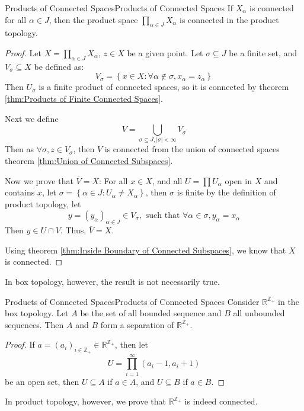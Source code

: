 \documentclass[../main.tex]{subfiles}
\begin{document}
\begin{theorem}{Products of Connected Spaces}{Products of Connected Spaces}
	If $X_{\alpha}$ is connected for all $\alpha \in J$, then the product space $\prod_{\alpha \in J} X_{\alpha}$ is connected in the product topology.
\end{theorem}
\begin{proof}
Let $X = \prod_{\alpha \in J} X_{\alpha}$, $z\in X$ be a given point. Let $\sigma \subseteq J$ be a finite set, and $V_{\sigma} \subseteq X$ be defined as:
\begin{equation*}
V_{\sigma} = \left\{ x\in X: \forall \alpha \notin \sigma, x_{\alpha} = z_{\alpha} \right\}
\end{equation*}
Then $U_{\sigma}$ is a finite product of connected spaces, so it is connected by theorem \ref{thm:Products of Finite Connected Spaces}.

Next we define
\begin{equation*}
V = \bigcup_{\sigma \subseteq J, |\sigma| < \infty } V_{\sigma} 
\end{equation*}
Then as $\forall \sigma, z\in V_{\sigma}$, then $V$ is connected from the union of connected spaces theorem \ref{thm:Union of Connected Subspaces}. 

Now we prove that $\overline{V} = X$: For all $x\in X$, and all $U = \prod U_{\alpha}$ open in $X$ and contains $x$, let $\sigma = \left\{ \alpha\in J : U_{\alpha} \neq X_{\alpha} \right\}$, then $\sigma$ is finite by the definition of product topology, let
\begin{equation*}
	y = (y_{\alpha})_{\alpha \in J} \in V_{\sigma}, \text{ such that } \forall \alpha\in \sigma, y_{\alpha} = x_{\alpha}
\end{equation*}
Then $y\in U\cap V$. Thus, $\overline{V} = X$. 

Using theorem \ref{thm:Inside Boundary of Connected Subspaces}, we know that $X$ is connected.
\end{proof}


In box topology, however, the result is not necessarily true.
\begin{example}{Products of Connected Spaces}{Products of Connected Spaces}
	Consider $\mathbb{R}^{\mathbb{Z}_+}$ in the box topology. Let $A$ be the set of all bounded sequence and $B$ all unbounded sequences. Then $A$ and $B$ form a separation of $\mathbb{R}^{\mathbb{Z}_+}$.
\begin{proof}
If $a = (a_i)_{i\in \mathbb{Z}_+} \in \mathbb{R}^{\mathbb{Z}_+}$, then let
\begin{equation*}
U = \prod_{i=1}^{\infty } (a_i-1,a_i+1)
\end{equation*}
be an open set, then $U \subseteq A$ if $a\in A$, and $U \subseteq B$ if $a\in B$.
\end{proof}

In product topology, however, we prove that $\mathbb{R}^{\mathbb{Z}_+}$ is indeed connected.
\end{example}
\end{document}

